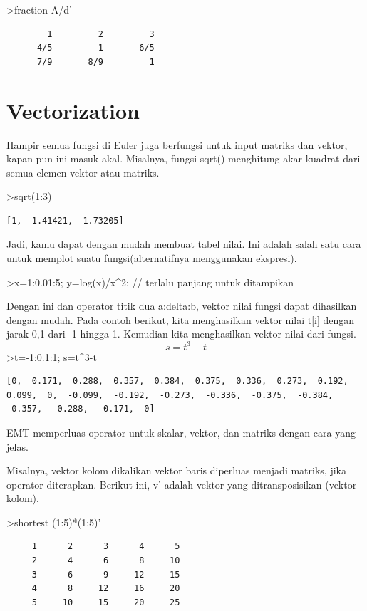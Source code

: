 \documentclass[
]{book}
\begin{document}
\textgreater fraction A/d'

\begin{verbatim}
        1         2         3 
      4/5         1       6/5 
      7/9       8/9         1 
\end{verbatim}

\section{Vectorization}\label{vectorization}

Hampir semua fungsi di Euler juga berfungsi untuk input matriks dan vektor, kapan pun ini masuk akal. Misalnya, fungsi sqrt() menghitung akar kuadrat dari semua elemen vektor atau matriks.

\textgreater sqrt(1:3)

\begin{verbatim}
[1,  1.41421,  1.73205]
\end{verbatim}

Jadi, kamu dapat dengan mudah membuat tabel nilai. Ini adalah salah satu cara untuk memplot suatu fungsi(alternatifnya menggunakan ekspresi).

\textgreater x=1:0.01:5; y=log(x)/x\^{}2; // terlalu panjang untuk ditampikan

Dengan ini dan operator titik dua a:delta:b, vektor nilai fungsi dapat dihasilkan dengan mudah. Pada contoh berikut, kita menghasilkan vektor nilai t{[}i{]} dengan jarak 0,1 dari -1 hingga 1. Kemudian kita menghasilkan vektor nilai dari fungsi. \[s = t^3-t\]\textgreater t=-1:0.1:1; s=t\^{}3-t

\begin{verbatim}
[0,  0.171,  0.288,  0.357,  0.384,  0.375,  0.336,  0.273,  0.192,
0.099,  0,  -0.099,  -0.192,  -0.273,  -0.336,  -0.375,  -0.384,
-0.357,  -0.288,  -0.171,  0]
\end{verbatim}

EMT memperluas operator untuk skalar, vektor, dan matriks dengan cara yang jelas.

Misalnya, vektor kolom dikalikan vektor baris diperluas menjadi matriks, jika operator diterapkan. Berikut ini, v' adalah vektor yang ditransposisikan (vektor kolom).

\textgreater shortest (1:5)*(1:5)'

\begin{verbatim}
     1      2      3      4      5 
     2      4      6      8     10 
     3      6      9     12     15 
     4      8     12     16     20 
     5     10     15     20     25 
\end{verbatim}
\end{document}
